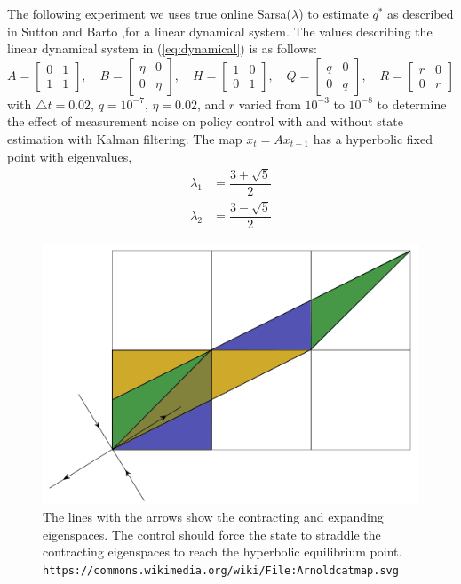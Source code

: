 \documentclass{article}
\begin{document}
The following experiment we uses true online Sarsa($\lambda$) to estimate $q^*$ as described in Sutton and Barto \cite{suttonAndBarto},for a linear dynamical system. The values describing the linear dynamical system in (\ref{eq:dynamical}) is as follows:
\[
A = \begin{bmatrix}
0 & 1 \\
1 & 1
\end{bmatrix}, \quad 
B = \begin{bmatrix}
\eta & 0 \\
0 & \eta
\end{bmatrix}, \quad
H = \begin{bmatrix}
1 & 0 \\
0 & 1
\end{bmatrix}, \quad
Q = \begin{bmatrix}
q & 0 \\
0 & q
\end{bmatrix}, \quad
R = \begin{bmatrix}
r & 0 \\
0 & r
\end{bmatrix}
\]
with $\triangle t = 0.02$, $q = 10^{-7}$, $\eta = 0.02$,  and $r$ varied from $10^{-3}$ to $10^{-8}$ to determine the effect of measurement noise on policy control with and without state estimation with Kalman filtering. The map $x_t = Ax_{t-1}$ has a hyperbolic fixed point with eigenvalues,
\begin{align*}
	\lambda_1 &= \dfrac{3 + \sqrt{5}}{2} \\
	\lambda_2 &= \dfrac{3 - \sqrt{5}}{2}
\end{align*}
\begin{figure}[H]
	\includegraphics[scale=0.5]{Arnoldcatmap.png}
	\caption{The lines with the arrows show the contracting and expanding eigenspaces. The control should force the state to straddle the contracting eigenspaces to reach the hyperbolic equilibrium point.  \texttt{https://commons.wikimedia.org/wiki/File:Arnoldcatmap.svg} }
\end{figure}
\end{document}
